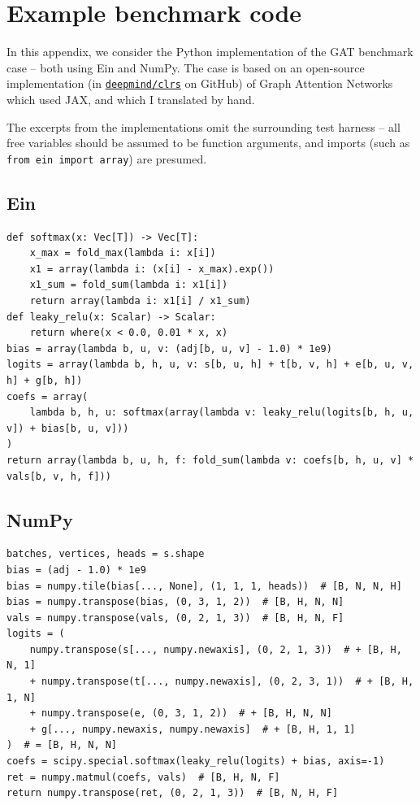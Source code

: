 \chapter{Example benchmark code}
\label{example-benchmark}

In this appendix, we consider the Python implementation of the GAT benchmark case -- both using Ein and NumPy. The case is based on an open-source implementation (in \href{https://github.com/google-deepmind/clrs/blob/8697f51663bd77548f4b3108816c84d163883361/clrs/_src/processors.py#L99}{\texttt{deepmind/clrs}} on GitHub) of Graph Attention Networks which used JAX, and which I translated by hand.

The excerpts from the implementations omit the surrounding test harness -- all free variables should be assumed to be function arguments, and imports (such as \texttt{from ein import array}) are presumed.

\section*{Ein}

\begin{verbatim}
def softmax(x: Vec[T]) -> Vec[T]:
    x_max = fold_max(lambda i: x[i])
    x1 = array(lambda i: (x[i] - x_max).exp())
    x1_sum = fold_sum(lambda i: x1[i])
    return array(lambda i: x1[i] / x1_sum)
def leaky_relu(x: Scalar) -> Scalar:
    return where(x < 0.0, 0.01 * x, x)
bias = array(lambda b, u, v: (adj[b, u, v] - 1.0) * 1e9)
logits = array(lambda b, h, u, v: s[b, u, h] + t[b, v, h] + e[b, u, v, h] + g[b, h])
coefs = array(
    lambda b, h, u: softmax(array(lambda v: leaky_relu(logits[b, h, u, v]) + bias[b, u, v]))
)
return array(lambda b, u, h, f: fold_sum(lambda v: coefs[b, h, u, v] * vals[b, v, h, f]))
\end{verbatim}

\section*{NumPy}

\begin{verbatim}
batches, vertices, heads = s.shape
bias = (adj - 1.0) * 1e9
bias = numpy.tile(bias[..., None], (1, 1, 1, heads))  # [B, N, N, H]
bias = numpy.transpose(bias, (0, 3, 1, 2))  # [B, H, N, N]
vals = numpy.transpose(vals, (0, 2, 1, 3))  # [B, H, N, F]
logits = (
    numpy.transpose(s[..., numpy.newaxis], (0, 2, 1, 3))  # + [B, H, N, 1]
    + numpy.transpose(t[..., numpy.newaxis], (0, 2, 3, 1))  # + [B, H, 1, N]
    + numpy.transpose(e, (0, 3, 1, 2))  # + [B, H, N, N]
    + g[..., numpy.newaxis, numpy.newaxis]  # + [B, H, 1, 1]
)  # = [B, H, N, N]
coefs = scipy.special.softmax(leaky_relu(logits) + bias, axis=-1)
ret = numpy.matmul(coefs, vals)  # [B, H, N, F]
return numpy.transpose(ret, (0, 2, 1, 3))  # [B, N, H, F]
\end{verbatim}

